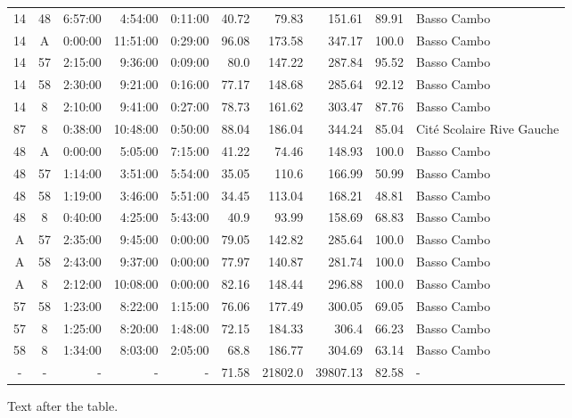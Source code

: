 \documentclass[twoside,12pt]{article}
\begin{document}
\begin{footnotesize}
\begin{longtable}{|c|c|r|r|r|r|r|r|r|l|}
	14	&	48	&	6:57:00	&	4:54:00	&	0:11:00	&	40.72	&	79.83	&	151.61	&	89.91	&	Basso Cambo	\\
	14	&	A	&	0:00:00	&	11:51:00	&	0:29:00	&	96.08	&	173.58	&	347.17	&	100.0	&	Basso Cambo	\\
	14	&	57	&	2:15:00	&	9:36:00	&	0:09:00	&	80.0	&	147.22	&	287.84	&	95.52	&	Basso Cambo	\\
	14	&	58	&	2:30:00	&	9:21:00	&	0:16:00	&	77.17	&	148.68	&	285.64	&	92.12	&	Basso Cambo	\\
	14	&	8	&	2:10:00	&	9:41:00	&	0:27:00	&	78.73	&	161.62	&	303.47	&	87.76	&	Basso Cambo	\\
	87	&	8	&	0:38:00	&	10:48:00	&	0:50:00	&	88.04	&	186.04	&	344.24	&	85.04	&	Cité Scolaire Rive Gauche	\\
	48	&	A	&	0:00:00	&	5:05:00	&	7:15:00	&	41.22	&	74.46	&	148.93	&	100.0	&	Basso Cambo	\\
	48	&	57	&	1:14:00	&	3:51:00	&	5:54:00	&	35.05	&	110.6	&	166.99	&	50.99	&	Basso Cambo	\\
	48	&	58	&	1:19:00	&	3:46:00	&	5:51:00	&	34.45	&	113.04	&	168.21	&	48.81	&	Basso Cambo	\\
	48	&	8	&	0:40:00	&	4:25:00	&	5:43:00	&	40.9	&	93.99	&	158.69	&	68.83	&	Basso Cambo	\\
	A	&	57	&	2:35:00	&	9:45:00	&	0:00:00	&	79.05	&	142.82	&	285.64	&	100.0	&	Basso Cambo	\\
	A	&	58	&	2:43:00	&	9:37:00	&	0:00:00	&	77.97	&	140.87	&	281.74	&	100.0	&	Basso Cambo	\\
	A	&	8	&	2:12:00	&	10:08:00	&	0:00:00	&	82.16	&	148.44	&	296.88	&	100.0	&	Basso Cambo	\\
	57	&	58	&	1:23:00	&	8:22:00	&	1:15:00	&	76.06	&	177.49	&	300.05	&	69.05	&	Basso Cambo	\\
	57	&	8	&	1:25:00	&	8:20:00	&	1:48:00	&	72.15	&	184.33	&	306.4	&	66.23	&	Basso Cambo	\\
	58	&	8	&	1:34:00	&	8:03:00	&	2:05:00	&	68.8	&	186.77	&	304.69	&	63.14	&	Basso Cambo	\\
	\hline
	-	&	-	&	-	&	-	&	-	&	71.58	&	21802.0	&	39807.13	&	82.58	& - \\

\end{longtable}


\end{footnotesize}

Text after the table.
\end{document}
